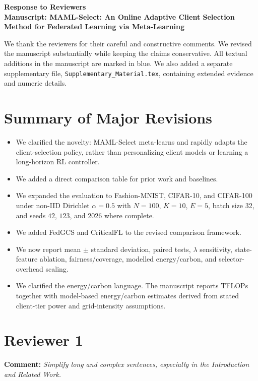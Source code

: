 \documentclass[11pt]{article}
\newcommand{\comment}[1]{\textbf{Comment:} \textit{#1}}
\begin{document}
\begin{center}
    {\Large \textbf{Response to Reviewers}}\\[0.5em]
    \textbf{Manuscript: MAML-Select: An Online Adaptive Client Selection Method for Federated Learning via Meta-Learning}
\end{center}

We thank the reviewers for their careful and constructive comments. We revised the manuscript substantially while keeping the claims conservative. All textual additions in the manuscript are marked in blue. We also added a separate supplementary file, \texttt{Supplementary\_Material.tex}, containing extended evidence and numeric details.

\section*{Summary of Major Revisions}

\begin{itemize}[leftmargin=*]
    \item We clarified the novelty: MAML-Select meta-learns and rapidly adapts the client-selection policy, rather than personalizing client models or learning a long-horizon RL controller.
    \item We added a direct comparison table for prior work and baselines.
    \item We expanded the evaluation to Fashion-MNIST, CIFAR-10, and CIFAR-100 under non-IID Dirichlet $\alpha=0.5$ with $N=100$, $K=10$, $E=5$, batch size 32, and seeds $42$, $123$, and $2026$ where complete.
    \item We added FedGCS and CriticalFL to the revised comparison framework.
    \item We now report mean $\pm$ standard deviation, paired tests, $\lambda$ sensitivity, state-feature ablation, fairness/coverage, modelled energy/carbon, and selector-overhead scaling.
    \item We clarified the energy/carbon language. The manuscript reports TFLOPs together with model-based energy/carbon estimates derived from stated client-tier power and grid-intensity assumptions.
\end{itemize}

\section*{Reviewer 1}

\comment{Simplify long and complex sentences, especially in the Introduction and Related Work.}
\end{document}
